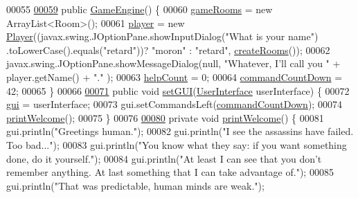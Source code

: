 \begin{DoxyCode}
00055 
\hypertarget{GameEngine_8java_source_l00059}{}\hyperlink{classGameEngine_a9e8a92f5021a34293060f9aaff4005de}{00059}     \textcolor{keyword}{public} \hyperlink{classGameEngine_a9e8a92f5021a34293060f9aaff4005de}{GameEngine}() \{
00060         \hyperlink{classGameEngine_ae5a2f252ec103e0630aebb8635341ea4}{gameRooms} = \textcolor{keyword}{new} ArrayList<Room>();
00061         \hyperlink{classGameEngine_a4666c6719428cc43014b30b305eeef5d}{player} = \textcolor{keyword}{new} \hyperlink{classpkg__world_1_1Player}{Player}((javax.swing.JOptionPane.showInputDialog(\textcolor{stringliteral}{"What is your name"})
      .toLowerCase().equals(\textcolor{stringliteral}{"retard"}))? \textcolor{stringliteral}{"moron"} : \textcolor{stringliteral}{"retard"}, \hyperlink{classGameEngine_a9410d92f7d0e6820059b1d07da364b09}{createRooms}());
00062         javax.swing.JOptionPane.showMessageDialog(null, \textcolor{stringliteral}{"Whatever, I'll call you "} + player.getName() + \textcolor{stringliteral}{"."}
      );
00063         \hyperlink{classGameEngine_a308a9926d553d53cb4c56c28588f6c62}{helpCount} = 0;
00064         \hyperlink{classGameEngine_ad4ff8d760eced9c7b76cdeb0dc989975}{commandCountDown} = 42;
00065     \}
00066 
\hypertarget{GameEngine_8java_source_l00071}{}\hyperlink{classGameEngine_aec901a5b590b3cd204f196165da5dfb6}{00071}     \textcolor{keyword}{public} \textcolor{keywordtype}{void} \hyperlink{classGameEngine_aec901a5b590b3cd204f196165da5dfb6}{setGUI}(\hyperlink{classUserInterface}{UserInterface} userInterface) \{
00072         \hyperlink{classGameEngine_a2a7d0bb6183b3f3ef3ee2008926374a0}{gui} = userInterface;
00073         gui.setCommandsLeft(\hyperlink{classGameEngine_ad4ff8d760eced9c7b76cdeb0dc989975}{commandCountDown});
00074         \hyperlink{classGameEngine_a9a2f3cb921bb19399e357bf14d26425b}{printWelcome}();
00075     \}
00076 
\hypertarget{GameEngine_8java_source_l00080}{}\hyperlink{classGameEngine_a9a2f3cb921bb19399e357bf14d26425b}{00080}     \textcolor{keyword}{private} \textcolor{keywordtype}{void} \hyperlink{classGameEngine_a9a2f3cb921bb19399e357bf14d26425b}{printWelcome}() \{
00081         gui.println(\textcolor{stringliteral}{"Greetings human."});
00082         gui.println(\textcolor{stringliteral}{"I see the assassins have failed. Too bad..."});
00083         gui.println(\textcolor{stringliteral}{"You know what they say: if you want something done, do it yourself."});
00084         gui.println(\textcolor{stringliteral}{"At least I can see that you don't remember anything. At last something that I can take
       advantage of."});
00085         gui.println(\textcolor{stringliteral}{"That was predictable, human minds are weak."});

\end{DoxyCode}
